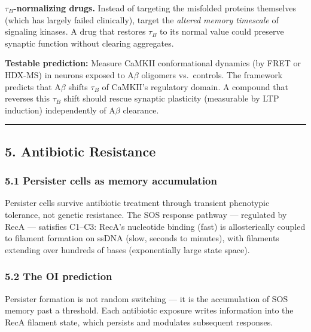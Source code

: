 \documentclass[
  11pt,
]{article}
\begin{document}
\textbf{\(\tau_B\)-normalizing drugs.} Instead of targeting the
misfolded proteins themselves (which has largely failed clinically),
target the \emph{altered memory timescale} of signaling kinases. A drug
that restores \(\tau_B\) to its normal value could preserve synaptic
function without clearing aggregates.

\textbf{Testable prediction:} Measure CaMKII conformational dynamics (by
FRET or HDX-MS) in neurons exposed to A\(\beta\) oligomers vs.~controls.
The framework predicts that A\(\beta\) shifts \(\tau_B\) of CaMKII's
regulatory domain. A compound that reverses this \(\tau_B\) shift should
rescue synaptic plasticity (measurable by LTP induction) independently
of A\(\beta\) clearance.

\begin{center}\rule{0.5\linewidth}{0.5pt}\end{center}

\hypertarget{antibiotic-resistance}{%
\subsection{5. Antibiotic Resistance}\label{antibiotic-resistance}}

\hypertarget{persister-cells-as-memory-accumulation}{%
\subsubsection{5.1 Persister cells as memory
accumulation}\label{persister-cells-as-memory-accumulation}}

Persister cells survive antibiotic treatment through transient
phenotypic tolerance, not genetic resistance. The SOS response pathway
--- regulated by RecA --- satisfies C1--C3: RecA's nucleotide binding
(fast) is allosterically coupled to filament formation on ssDNA (slow,
seconds to minutes), with filaments extending over hundreds of bases
(exponentially large state space).

\hypertarget{the-oi-prediction-1}{%
\subsubsection{5.2 The OI prediction}\label{the-oi-prediction-1}}

Persister formation is not random switching --- it is the accumulation
of SOS memory past a threshold. Each antibiotic exposure writes
information into the RecA filament state, which persists and modulates
subsequent responses.
\end{document}
